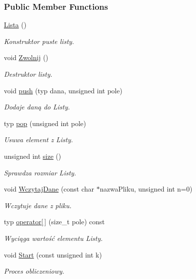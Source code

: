 \subsubsection*{Public Member Functions}
\begin{DoxyCompactItemize}
\item 
\hyperlink{class_lista_a23a5b3313a893057276942e74f330b89}{Lista} ()
\begin{DoxyCompactList}\small\item\em Konstruktor puste listy. \end{DoxyCompactList}\item 
void \hyperlink{class_lista_afcc18699707e00f35d73fa53eaa9f1da}{Zwolnij} ()
\begin{DoxyCompactList}\small\item\em Destruktor listy. \end{DoxyCompactList}\item 
void \hyperlink{class_lista_a4f6959cec316c8882a1dfc64d92480c1}{push} (typ dana, unsigned int pole)
\begin{DoxyCompactList}\small\item\em Dodaje daną do Listy. \end{DoxyCompactList}\item 
typ \hyperlink{class_lista_aea1df940db61c9565cc6f95a6d3df202}{pop} (unsigned int pole)
\begin{DoxyCompactList}\small\item\em Usuwa element z Listy. \end{DoxyCompactList}\item 
unsigned int \hyperlink{class_lista_a29244b4a79de727a53c23e84bca6d61e}{size} ()
\begin{DoxyCompactList}\small\item\em Sprawdza rozmiar Listy. \end{DoxyCompactList}\item 
void \hyperlink{class_lista_a8dd8489d2db5ce989ffd71268a11e18c}{Wczytaj\-Dane} (const char $\ast$nazwa\-Pliku, unsigned int n=0)
\begin{DoxyCompactList}\small\item\em Wczytuje dane z pliku. \end{DoxyCompactList}\item 
typ \hyperlink{class_lista_a3ffb056a10d97afbe52bb8a3ba6fbb6a}{operator\mbox{[}$\,$\mbox{]}} (size\-\_\-t pole) const 
\begin{DoxyCompactList}\small\item\em Wyciąga wartość elementu Listy. \end{DoxyCompactList}\item 
void \hyperlink{class_lista_aa5f8153e21cbd4569f4e16a3c466e947}{Start} (const unsigned int k)
\begin{DoxyCompactList}\small\item\em Proces obliczeniowy. \end{DoxyCompactList}\end{DoxyCompactItemize}
